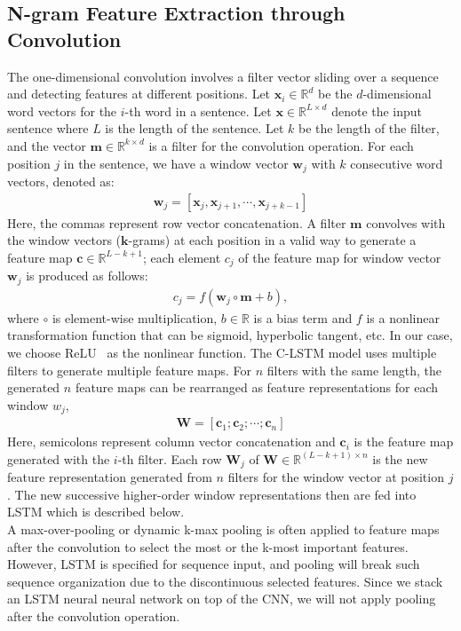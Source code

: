 \documentclass[11pt,letterpaper]{article}
\begin{document}
\subsection{N-gram Feature Extraction through Convolution}
The one-dimensional convolution involves a filter vector sliding over a
sequence and detecting features at different positions. Let
$\mathbf{x}_i \in \mathbb{R}^d$ be the $d$-dimensional word vectors for
the $i$-th word in a sentence. Let $\mathbf{x} \in \mathbb{R}^{L \times
d}$ denote the input sentence where $L$ is the length of the
sentence. Let $k$ be the length of the filter, and the vector
$\mathbf{m} \in \mathbb{R}^{k \times d}$ is a filter for the convolution
operation. For each position $j$ in the sentence, we have a window
vector $\mathbf{w}_j$ with $k$ consecutive word vectors, denoted as:
\begin{align}
\mathbf{w}_j = [\mathbf{x}_j,\mathbf{x}_{j+1}, \cdots ,\mathbf{x}_{j+k-1}]
\end{align}
Here, the commas represent row vector concatenation. A filter
$\mathbf{m}$ convolves with the window vectors ($\mathbf{k}$-grams) at each
position in a valid way to generate a feature map $\mathbf{c} \in
\mathbb{R}^{L-k+1}$; each element $c_j$ of the feature map for window
vector $\mathbf{w}_j$ is produced as follows:
\begin{align}
c_j = f(\mathbf{w}_j \circ \mathbf{m} + b),
\end{align}
where $\circ$ is element-wise multiplication, $b \in \mathbb{R}$ is a
bias term and $f$ is a nonlinear transformation function that can be
sigmoid, hyperbolic tangent, etc. In our case, we choose
ReLU~\cite{relu} as the nonlinear function. The C-LSTM model uses
multiple filters to generate multiple feature maps. For $n$ filters with
the same length, the generated $n$ feature maps can be rearranged as
feature representations for each window $w_j$,
\begin{align}
\mathbf{W} = [\mathbf{c}_1;\mathbf{c}_2; \cdots;\mathbf{c}_n]
\end{align}
Here, semicolons represent column vector concatenation and
$\mathbf{c}_i$ is the feature map generated with the $i$-th filter. Each
row $\mathbf{W}_j$ of $\mathbf{W} \in \mathbb{R}^ {(L-k+1)\times n}$ is
the new feature representation generated from $n$ filters for the window
vector at position $j$. The new successive higher-order window
representations then are fed into LSTM which is described below.\\
\indent A max-over-pooling or dynamic k-max pooling is often applied to
feature maps after the convolution to select the most or the k-most
important features. However, LSTM is specified for sequence input, and
pooling will break such sequence organization due to the discontinuous
selected features. Since we stack an LSTM neural neural network on top of
the CNN, we will not apply pooling after the convolution operation.
\end{document}
